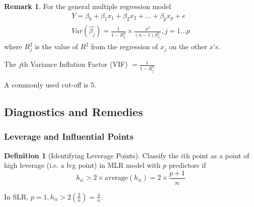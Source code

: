 \documentclass[11pt]{article}
\theoremstyle{definition}
\newtheorem{definition}{Definition}[section]
\newtheorem{remark}{Remark}[section]
\numberwithin{equation}{section}
\begin{document}
\begin{remark}
  For the general multiple regression model
  \begin{gather}
    Y=\beta_0+\beta_1x_1+\beta_2x_2+\dots+\beta_px_p+e\\
    Var(\hat{\beta_j}) = \frac{1}{1-R^2_j}\times\frac{\sigma^2}{(n-1)S^2_{x_j}}, j=1\dots p
  \end{gather}
  where $R_j^2$ is the value of $R^2$ from the regression of $x_j$ on the other $x$'s.
\end{remark}
\begin{writenotes}
  The $j$th Variance Inflation Factor (VIF) $=\frac{1}{1-R^2_j}$

  A commonly used cut-off is 5.
\end{writenotes}

\newpage

\subsection{Diagnostics and Remedies}
\subsubsection{Leverage and Influential Points}
\begin{definition}[Identifying Leverage Points]
Classify the $i$th point as a point of high leverage (i.e. a lvg point) in MLR model with $p$ predictors if
 \begin{equation}
   h_{ii} > 2\times\text{average}(h_{ii}) = 2\times \frac{p+1}{n}
 \end{equation}
\end{definition}
\begin{writenotes}
  In SLR, $p=1, h_{ii} > 2\left(\frac{2}{n}\right)=\frac{4}{n}$.
\end{writenotes}
\end{document}
